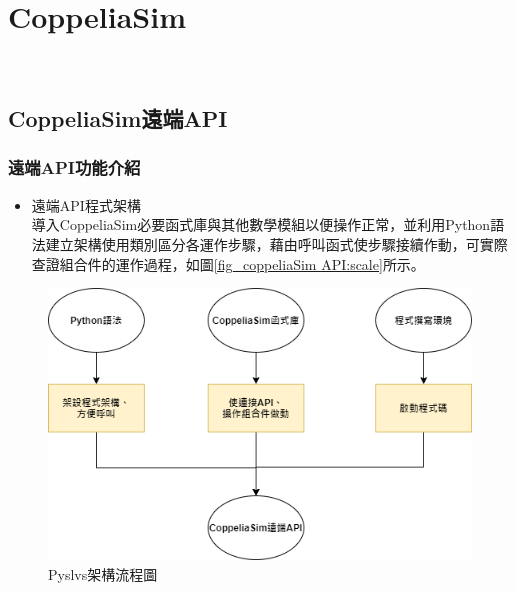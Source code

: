 \documentclass[14pt,a4paper]{report}  %
\newcommand{\fourteen}{\fontsize{14pt}{\baselineskip}\selectfont}%
\begin{document}
{\begin{enumerate}
	\end{enumerate}
    	
    	\chapter{CoppeliaSim}
    	\hspace*{\fill} \\
      \section{CoppeliaSim遠端API}
      \subsection{遠端API功能介紹}
      \fourteen {利用組合件放入CoppeliaSim中進行從屬關係的架設與半自動設定物理條件，藉由API(Application Programming Interface)連接CoppeliaSim遠端操控馬達使組合件作動，以查證組合件之機構在運作時的實際狀況。}
      \begin{itemize}
     \item 遠端API程式架構
     \hspace*{\fill} \\
     導入CoppeliaSim必要函式庫與其他數學模組以便操作正常，並利用Python語法建立架構使用類別區分各運作步驟，藉由呼叫函式使步驟接續作動，可實際查證組合件的運作過程，如圖\ref{fig_coppeliaSim API:scale}所示。
     \end{itemize}
     
     \begin{figure}[hbt!]
        \centering
        \includegraphics[scale=0.6]{CoppeliaSim API.png} 
        \caption{Pyslvs架構流程圖}
        \label{fig_coppeliasim API:scale}
        \end{figure}
        
}
\end{document}
